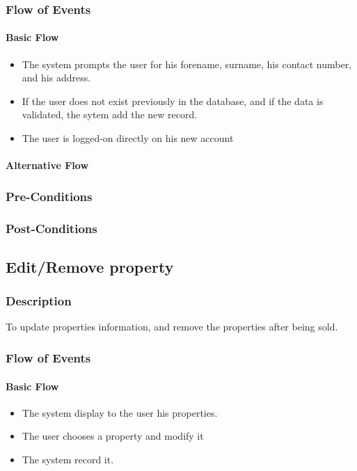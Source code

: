 \documentclass[a4paper,12pt]{article}
\begin{document}
\subsubsection{Flow of Events}
\paragraph{Basic Flow}
\begin{itemize}
\item The system prompts the user for his forename, surname, his contact number, and his address.
\item If the user does not exist previously in the database, and if the data is validated, the sytem add the new record.
\item The user is logged-on directly on his new account
\end{itemize}

\paragraph{Alternative Flow}
\begin{itemize}
\end{itemize}

\subsubsection{Pre-Conditions}
\subsubsection{Post-Conditions}

\subsection{Edit/Remove property}
\subsubsection{Description}
To update properties information, and remove the properties after being sold.
\subsubsection{Flow of Events}
\paragraph{Basic Flow}
\begin{itemize}
\item The system display to the user his properties.
\item The user chooses a property and modify it
\item The system record it.
\end{itemize}
\end{document}
